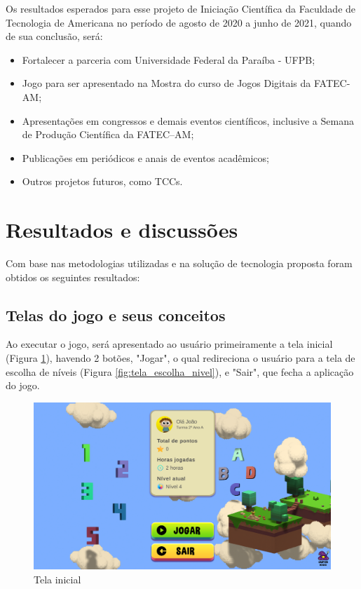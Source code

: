 \documentclass[article,12pt,openany,oneside,a4paper,english,brazil]{abntex2}
\begin{document}
Os resultados esperados para esse projeto de Iniciação Científica da Faculdade de Tecnologia de Americana no período de agosto de 2020 a junho de 2021, quando de sua conclusão, será:

\begin{itemize}
\item Fortalecer a parceria com Universidade Federal da Paraíba - UFPB;
\item Jogo para ser apresentado na Mostra do curso de Jogos Digitais da FATEC-AM;
\item Apresentações em congressos e demais eventos científicos, inclusive a Semana de Produção Científica da FATEC–AM;
\item Publicações em periódicos e anais de eventos acadêmicos;
\item Outros projetos futuros, como TCCs.
\end{itemize}

\section{Resultados e discussões}
\label{sc:resultadosFinais}
Com base nas metodologias utilizadas e na solução de tecnologia proposta
foram obtidos os seguintes resultados:

\subsection{Telas do jogo e seus conceitos}
\label{sc:telas_jogo}

Ao executar o jogo, será apresentado ao usuário primeiramente a tela inicial (Figura \ref{fig:tela_inicial}), havendo 2 botões, "Jogar", o qual redireciona o usuário para a tela de escolha de níveis (Figura \ref{fig:tela_escolha_nivel}), e "Sair", que fecha a aplicação do jogo.

\begin{figure}[H]
    \centering
    \caption{Tela inicial}
    \label{fig:tela_inicial}
    \includegraphics[width=0.8\linewidth]{GameScreenshots/Home.png}
\end{figure}
\end{document}
